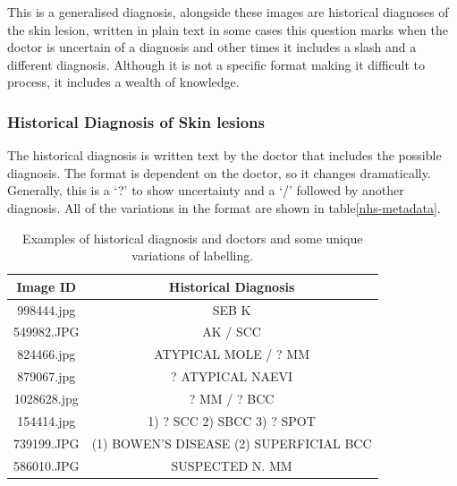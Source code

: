 This is a generalised diagnosis, alongside these images are historical diagnoses of the skin lesion, written in plain text in some cases this question marks when the doctor is uncertain of a diagnosis and other times it includes a slash and a different diagnosis. Although it is not a specific format making it difficult to process, it includes a wealth of knowledge.

\subsubsection{Historical Diagnosis of Skin lesions}

The historical diagnosis is written text by the doctor that includes the possible diagnosis. The format is dependent on the doctor, so it changes dramatically. Generally, this is a `?' to show uncertainty and a `/' followed by another diagnosis. All of the variations in the format are shown in table\ref{nhs-metadata}.

\begin{table}
    \centering
    \begin{tabular}{|c|c|}
        \hline
        Image ID & Historical Diagnosis
        \\
        \hline
        998444.jpg & SEB K
        \\
        \hline
        549982.JPG & AK / SCC
        \\
        \hline
        824466.jpg & ATYPICAL MOLE / ? MM
        \\
        \hline
        879067.jpg & ? ATYPICAL NAEVI
        \\
        \hline
        1028628.jpg & ? MM / ? BCC
        \\
        \hline
        154414.jpg & 1) ? SCC 2) SBCC 3) ? SPOT
        \\
        \hline
        739199.JPG & (1) BOWEN'S DISEASE (2) SUPERFICIAL BCC
        \\
        \hline
        586010.JPG & SUSPECTED N. MM
        \\
        \hline
    \end{tabular}
    \caption{Examples of historical diagnosis and doctors and some unique variations of labelling.}
\end{table}\label{nhs-metadata}        



